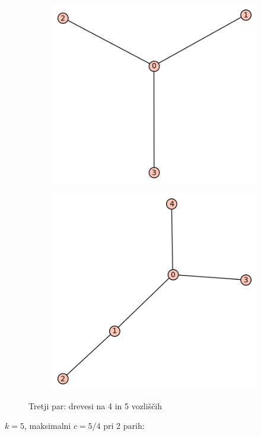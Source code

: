 \documentclass[12pt, a4paper]{article}
\begin{document}
\begin{center}
\begin{center}
\begin{figure}[!htb]
\centering
\begin{subfigure}{0.5\textwidth}
  \centering
  \includegraphics[width=0.4\linewidth]{t-4}
\end{subfigure}%
\begin{subfigure}{0.5\textwidth}
  \centering
  \includegraphics[width=0.5\linewidth]{t-6}
\end{subfigure}
\caption{Tretji par: drevesi na 4 in 5 vozliščih}
\label{fig:test}
\end{figure}
\end{center}


$k=5$, maksimalni $c=5/4$ pri 2 parih:\\


\end{center}
\end{document}
